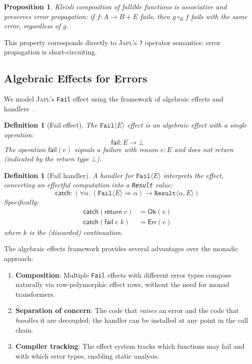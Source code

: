 \documentclass[11pt,twocolumn]{article}
\newtheorem{proposition}[theorem]{Proposition}
\newtheorem{definition}[theorem]{Definition}
\newcommand{\japl}{\textsc{Japl}}
\newcommand{\Fail}{\texttt{Fail}}
\newcommand{\Result}{\texttt{Result}}
\newcommand{\OK}{\ensuremath{\mathsf{Ok}}}
\newcommand{\Err}{\ensuremath{\mathsf{Err}}}
\begin{document}
\begin{proposition}
Kleisli composition of fallible functions is associative and preserves error propagation: if $f : A \to B + E$ fails, then $g \circ_K f$ fails with the same error, regardless of $g$.
\end{proposition}

This property corresponds directly to \japl{}'s \texttt{?} operator semantics: error propagation is short-circuiting.

\subsection{Algebraic Effects for Errors}

We model \japl{}'s \Fail{} effect using the framework of algebraic effects and handlers~\cite{plotkin2009handlers}.

\begin{definition}[Fail effect]
The $\Fail\langle E\rangle$ effect is an algebraic effect with a single operation:
\[
  \mathsf{fail} : E \to \bot
\]
The operation $\mathsf{fail}(e)$ signals a failure with reason $e : E$ and does not return (indicated by the return type $\bot$).
\end{definition}

\begin{definition}[Fail handler]
A handler for $\Fail\langle E\rangle$ interprets the effect, converting an effectful computation into a \Result{} value:
\[
  \mathsf{catch} : (\forall \alpha.\, (\Fail\langle E\rangle \Rightarrow \alpha) \to \Result\langle \alpha, E\rangle)
\]
Specifically:
\begin{align*}
  \mathsf{catch}(\mathsf{return}\;v) &= \OK(v) \\
  \mathsf{catch}(\mathsf{fail}\;e\;k) &= \Err(e)
\end{align*}
where $k$ is the (discarded) continuation.
\end{definition}

The algebraic effects framework provides several advantages over the monadic approach:

\begin{enumerate}[leftmargin=*]
  \item \textbf{Composition}: Multiple \Fail{} effects with different error types compose naturally via row-polymorphic effect rows, without the need for monad transformers.
  \item \textbf{Separation of concern}: The code that \emph{raises} an error and the code that \emph{handles} it are decoupled; the handler can be installed at any point in the call chain.
  \item \textbf{Compiler tracking}: The effect system tracks which functions may fail and with which error types, enabling static analysis.
\end{enumerate}
\end{document}
